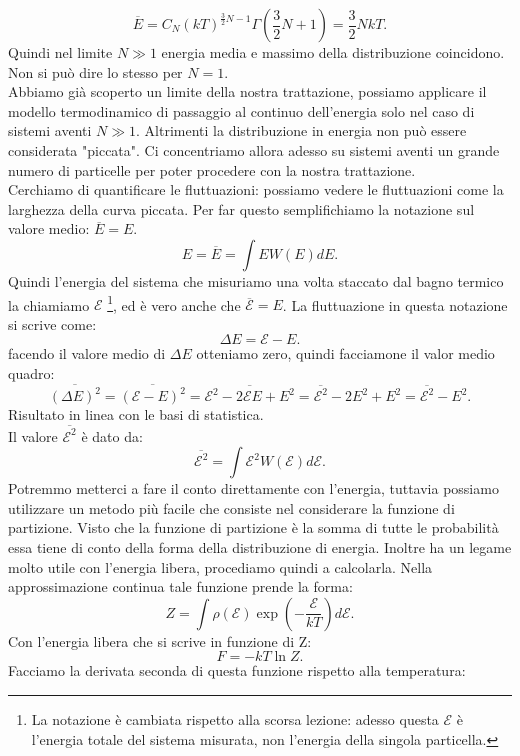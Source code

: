 \[
	\overline{E} = C_{N} \left( kT \right) ^{\frac{3}{2}N-1} \Gamma \left( \frac{3}{2}N +1 \right) = \frac{3}{2}N kT
.\] 
Quindi nel limite $N\gg 1$ energia media e massimo della distribuzione coincidono. Non si può dire lo stesso per $N= 1$.\\
Abbiamo già scoperto un limite della nostra trattazione, possiamo applicare il modello termodinamico di passaggio al continuo dell'energia solo nel caso di sistemi aventi $N \gg 1$. Altrimenti la distribuzione in energia non può essere considerata "piccata". Ci concentriamo allora adesso su sistemi aventi un grande numero di particelle per poter procedere con la nostra trattazione.\\
Cerchiamo di quantificare le fluttuazioni: possiamo vedere le fluttuazioni come la larghezza della curva piccata. Per far questo semplifichiamo la notazione sul valore medio: $\overline{E} = E$.
\[
	E =  \overline{E} = \int E W( E ) dE
.\] 
Quindi l'energia del sistema che misuriamo una volta staccato dal bagno termico la chiamiamo $\mathcal{E}$ \footnote{La notazione è cambiata rispetto alla scorsa lezione: adesso questa $\mathcal{E}$ è l'energia totale del sistema misurata, non l'energia della singola particella.}, ed è vero anche che $\overline{\mathcal{E}}= E$. La fluttuazione in questa notazione si scrive come:
\[
	\Delta E = \mathcal{E}- E 
.\] 
facendo il valore medio di $\Delta E $ otteniamo zero, quindi facciamone il valor medio quadro:
\[
	\overline{\left( \Delta E \right) ^2} = \overline{\left( \mathcal{E} - E \right)^2 } = \overline{\mathcal{E}^2- 2\mathcal{E} E + E^2}= 
	\overline{\mathcal{E}^2} - 2 E^2 + E^2 = \overline{\mathcal{E}^2} - E^2
.\] 
Risultato in linea con le basi di statistica. \\
Il valore $\overline{\mathcal{E}^2}$ è dato da:
\[
	\overline{\mathcal{E}^2} = \int \mathcal{E}^2 W( \mathcal{E}) d\mathcal{E}
.\] 
Potremmo metterci a fare il conto direttamente con l'energia, tuttavia possiamo utilizzare un metodo più facile che consiste nel considerare la funzione di partizione. Visto che la funzione di partizione è la somma di tutte le probabilità essa tiene di conto della forma della distribuzione di energia. Inoltre ha un legame molto utile con l'energia libera, procediamo quindi a calcolarla. Nella approssimazione continua tale funzione prende la forma:
\[
	Z = \int\rho\left( \mathcal{E} \right) \exp\left( -\frac{\mathcal{E}}{kT} \right) d\mathcal{E}
.\] 
Con l'energia libera che si scrive in funzione di Z:
\[
	F = -kT \ln Z
.\]
Facciamo la derivata seconda di questa funzione rispetto alla temperatura:
